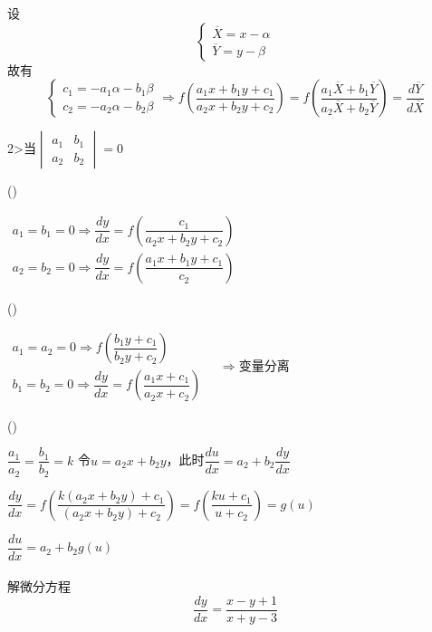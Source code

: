 \documentclass[oneside]{book} %
\begin{document}
设
$$
\begin{cases}
    \overline{X} = x - \alpha \\ 
    \overline{Y} = y - \beta  
\end{cases}$$
\indent 故有
$$
\begin{cases}
    c_{1} = -a_{1}\alpha - b_{1}\beta \\
    c_{2} = -a_{2}\alpha - b_{2}\beta 
\end{cases} \Rightarrow
f\left(\frac{a_{1}x + b_{1}y + c_{1}}{a_{2}x + b_{2}y + c_{2}}\right) = f\left(\frac{a_{1}\overline{X} + b_{1}\overline{Y}}{a_{2}\overline{X} + b_{2}\overline{Y}} \right) = \frac{d\overline{Y} }{d\overline{X} }$$

2>当$
\begin{vmatrix}
    a_{1} & b_{1} \\
    a_{2} & b_{2}
\end{vmatrix} = 0 $

()

\quad $\begin{array}{l}
    a_{1} = b_{1} = 0 \Rightarrow \dfrac{dy}{dx} = f\left(\dfrac{c_{1}}{a_{2}x + b_{2}y + c_{2}}\right) \\
    a_{2} = b_{2} = 0 \Rightarrow \dfrac{dy}{dx} = f\left(\dfrac{a_{1}x + b_{1}y + c_{1}}{c_{2}}\right)
\end{array}$

()

\quad $\begin{array}{l}
    a_{1} = a_{2} = 0 \Rightarrow f\left(\dfrac{b_{1}y + c_{1}}{b_{2}y + c_{2}}\right) \\

b_{1} = b_{2} = 0 \Rightarrow \dfrac{dy}{dx} = f\left(\dfrac{a_{1}x + c_{1}}{a_{2}x + c_{2}}\right) 
\end{array} \quad \Rightarrow $变量分离

()

\quad $\dfrac{a_{1}}{a_{2}} = \dfrac{b_{1}}{b_{2}} = k $
令$u = a_{2}x + b_{2}y$，此时$\dfrac{du}{dx} = a_{2} + b_{2}\dfrac{dy}{dx}$

\quad $\dfrac{dy}{dx} = f\left(\dfrac{k(a_{2}x + b_{2}y) + c_{1}}{(a_{2}x + b_{2}y) + c_{2}}\right) = f\left(\dfrac{ku + c_{1}}{u + c_{2}}\right) = g(u)$

\quad $\dfrac{du}{dx} = a_{2} + b_{2}g(u)$ 
\\ \hspace*{\fill} \\
\noindent {}解微分方程$$\dfrac{dy}{dx} = \dfrac{x - y + 1}{x + y - 3}$$
\end{document}
